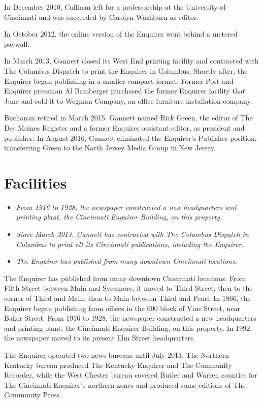 In December 2010, Callinan left for a professorship at the University of
Cincinnati and was succeeded by Carolyn Washburn as editor.

In October 2012, the online version of the Enquirer went behind a
metered paywall.

In March 2013, Gannett closed its West End printing facility and
contracted with The Columbus Dispatch to print the Enquirer in Columbus.
Shortly after, the Enquirer began publishing in a smaller compact
format. Former Post and Enquirer pressman Al Bamberger purchased the
former Enquirer facility that June and sold it to Wegman Company, an
office furniture installation company.

Buchanan retired in March 2015. Gannett named Rick Green, the editor of
The Des Moines Register and a former Enquirer assistant editor, as
president and publisher. In August 2016, Gannett eliminated the
Enquirer's Publisher position, transferring Green to the North Jersey
Media Group in New Jersey.

\section{Facilities}\label{facilities}

\begin{itemize}
\item
  \emph{From 1916 to 1928, the newspaper constructed a new headquarters
  and printing plant, the Cincinnati Enquirer Building, on this
  property.}
\item
  \emph{Since March 2013, Gannett has contracted with The Columbus
  Dispatch in Columbus to print all its Cincinnati publications,
  including the Enquirer.}
\item
  \emph{The Enquirer has published from many downtown Cincinnati
  locations.}
\end{itemize}

The Enquirer has published from many downtown Cincinnati locations. From
Fifth Street between Main and Sycamore, it moved to Third Street, then
to the corner of Third and Main, then to Main between Third and Pearl.
In 1866, the Enquirer began publishing from offices in the 600 block of
Vine Street, near Baker Street. From 1916 to 1928, the newspaper
constructed a new headquarters and printing plant, the Cincinnati
Enquirer Building, on this property. In 1992, the newspaper moved to its
present Elm Street headquarters.

The Enquirer operated two news bureaus until July 2013. The Northern
Kentucky bureau produced The Kentucky Enquirer and The Community
Recorder, while the West Chester bureau covered Butler and Warren
counties for The Cincinnati Enquirer's northern zones and produced some
editions of The Community Press.

